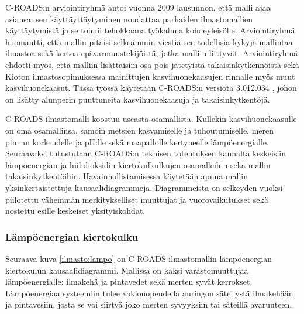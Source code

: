 \documentclass[finnish,12pt,a4paper,pdftex]{article}
\begin{document}
\begin{onehalfspacing}
C-ROADS:n arviointiryhmä antoi vuonna 2009 lausunnon, että malli ajaa asiansa: sen käyttäyttäytyminen noudattaa parhaiden ilmastomallien käyttäytymistä ja se toimii tehokkaana työkaluna kohdeyleisölle. Arviointiryhmä huomautti, että mallin pitäisi selkeämmin viestiä sen todellisia kykyjä mallintaa ilmastoa sekä kertoa epävarmuustekijöistä, jotka malliin liittyvät. Arviointiryhmä ehdotti myös, että malliin lisättäisiin osa pois jätetyistä takaisinkytkennöistä sekä Kioton ilmastosopimuksessa \cite{KyotoManual} mainittujen kasvihuonekaasujen rinnalle myös muut kasvihuonekaasut. \cite{Watson2009} Tässä työssä käytetään C-ROADS:n versiota 3.012.034 \cite{Croads}, johon on lisätty alunperin puuttuneita kasvihuonekaasuja ja takaisinkytkentöjä. 

C-ROADS-ilmastomalli koostuu useasta osamallista. Kullekin kasvihuonekaasulle on oma osamallinsa, samoin metsien kasvamiselle ja tuhoutumiselle, meren pinnan korkeudelle ja pH:lle sekä maapallolle kertyneelle lämpöenergialle. \cite{Croads, CroadsFlightSimulator2011, Fiddaman2012} Seuraavaksi tutustutaan C-ROADS:n teknisen toteutuksen kannalta keskeisiin lämpöenergian ja hiilidioksidin kiertokulkulkujen osamalleihin sekä mallin takaisinkytkentöihin. Havainnollistamisessa käytetään apuna mallin yksinkertaistettuja kausaalidiagrammeja. Diagrammeista on selkeyden vuoksi piilotettu vähemmän merkitykselliset muuttujat ja vuorovaikutukset sekä nostettu esille keskeiset yksityiskohdat. 

\subsubsection{Lämpöenergian kiertokulku \label{ilmasto:croads:lampo}}

Seuraava kuva \ref{ilmasto:lampo} on C-ROADS-ilmastomallin lämpöenergian kiertokulun kausaalidiagrammi. Mallissa on kaksi varastomuuttujaa lämpöenergialle: ilmakehä ja pintavedet sekä merten syvät kerrokset. Lämpöenergiaa systeemiin tulee vakionopeudella auringon säteilystä ilmakehään ja pintavesiin, josta se voi siirtyä joko merten syvyyksiin tai säteillä avaruuteen. \cite{Croads, CroadsFlightSimulator2011} 


\end{onehalfspacing}
\end{document}
